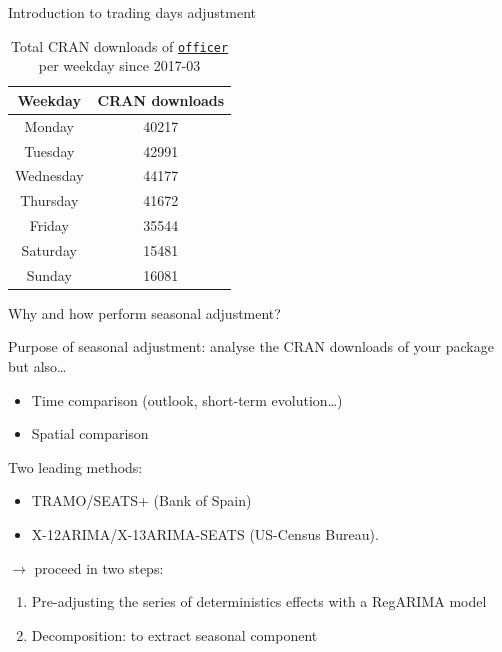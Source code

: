 \documentclass[10pt,xcolor=table,color={dvipsnames,usenames},ignorenonframetext,usepdftitle=false,french]{beamer}
\providecommand{\tightlist}{%
  \setlength{\parskip}{0pt}
  }
\begin{document}
\begin{frame}{Introduction to trading days adjustment}
\protect\hypertarget{introduction-to-trading-days-adjustment}{}

\begin{table}
\begin{tabular}{cc}
\toprule
Weekday & CRAN downloads \\
\midrule
Monday & 40217\\
Tuesday & 42991\\
Wednesday & 44177\\
Thursday & 41672\\
Friday & 35544\\
Saturday & 15481\\
Sunday & 16081\\
\bottomrule
\end{tabular}
\caption{Total CRAN downloads of \href{https://CRAN.R-project.org/package=officer}{\texttt{officer}} per weekday since 2017-03}
\end{table}

\end{frame}

\begin{frame}{Why and how perform seasonal adjustment?}
\protect\hypertarget{why-and-how-perform-seasonal-adjustment}{}

Purpose of seasonal adjustment: analyse the CRAN downloads of your
package but also\ldots{}

\begin{itemize}
\tightlist
\item
  Time comparison (outlook, short-term evolution\ldots{})\\
\item
  Spatial comparison
\end{itemize}

\bigskip
\pause

Two leading methods:

\begin{itemize}
\tightlist
\item
  TRAMO/SEATS+ (Bank of Spain)\\
\item
  X-12ARIMA/X-13ARIMA-SEATS (US-Census Bureau).
\end{itemize}

\bigskip
\pause

\(\rightarrow\) proceed in two steps:

\begin{enumerate}
\item
  Pre-adjusting the series of deterministics effects with a RegARIMA
  model
\item
  Decomposition: to extract seasonal component
\end{enumerate}

\end{frame}
\end{document}
